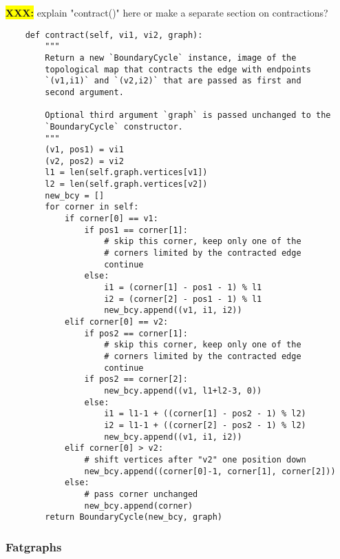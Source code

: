\colorbox{yellow}{\bfseries XXX:} explain "contract()" here or make a
separate section on contractions?
\begin{lstlisting}
    def contract(self, vi1, vi2, graph):
        """
        Return a new `BoundaryCycle` instance, image of the
        topological map that contracts the edge with endpoints
        `(v1,i1)` and `(v2,i2)` that are passed as first and
        second argument.

        Optional third argument `graph` is passed unchanged to the
        `BoundaryCycle` constructor.
        """
        (v1, pos1) = vi1
        (v2, pos2) = vi2
        l1 = len(self.graph.vertices[v1])
        l2 = len(self.graph.vertices[v2])
        new_bcy = []
        for corner in self:
            if corner[0] == v1:
                if pos1 == corner[1]:
                    # skip this corner, keep only one of the
                    # corners limited by the contracted edge
                    continue
                else: 
                    i1 = (corner[1] - pos1 - 1) % l1
                    i2 = (corner[2] - pos1 - 1) % l1
                    new_bcy.append((v1, i1, i2))
            elif corner[0] == v2:
                if pos2 == corner[1]:
                    # skip this corner, keep only one of the
                    # corners limited by the contracted edge
                    continue
                if pos2 == corner[2]:
                    new_bcy.append((v1, l1+l2-3, 0))
                else:
                    i1 = l1-1 + ((corner[1] - pos2 - 1) % l2)
                    i2 = l1-1 + ((corner[2] - pos2 - 1) % l2)
                    new_bcy.append((v1, i1, i2))
            elif corner[0] > v2:
                # shift vertices after "v2" one position down
                new_bcy.append((corner[0]-1, corner[1], corner[2]))
            else:
                # pass corner unchanged
                new_bcy.append(corner)
        return BoundaryCycle(new_bcy, graph)

\end{lstlisting}


\subsubsection{Fatgraphs}
\label{sec:fatgraphs}

